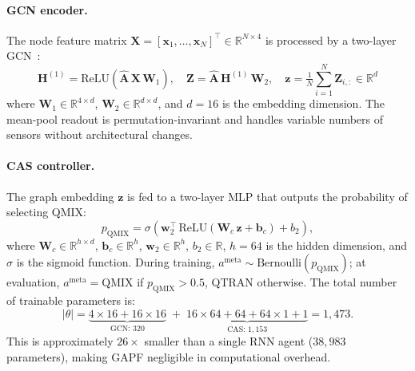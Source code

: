 \documentclass[12pt, onecolumn, journal]{IEEEtran}
\begin{document}
\paragraph{GCN encoder.}
The node feature matrix $\mathbf{X} = [\mathbf{x}_1, \dots, \mathbf{x}_N]^\top \in \mathbb{R}^{N \times 4}$ is processed by a two-layer GCN~\cite{kipf2017semi}:
\begin{equation}
    \mathbf{H}^{(1)} = \text{ReLU}(\hat{\mathbf{A}}\,\mathbf{X}\,\mathbf{W}_1), \quad
    \mathbf{Z} = \hat{\mathbf{A}}\,\mathbf{H}^{(1)}\,\mathbf{W}_2, \quad
    \mathbf{z} = \tfrac{1}{N}\textstyle\sum_{i=1}^{N} \mathbf{Z}_{i,:} \in \mathbb{R}^{d}
    \label{eq:gcn}
\end{equation}
where $\mathbf{W}_1 \in \mathbb{R}^{4 \times d}$, $\mathbf{W}_2 \in \mathbb{R}^{d \times d}$, and $d = 16$ is the embedding dimension. The mean-pool readout is permutation-invariant and handles variable numbers of sensors without architectural changes.

\paragraph{CAS controller.}
The graph embedding $\mathbf{z}$ is fed to a two-layer MLP that outputs the probability of selecting QMIX:
\begin{equation}
    p_{\text{QMIX}} = \sigma\!\left(\mathbf{w}_2^\top\,\text{ReLU}\!\left(\mathbf{W}_c\,\mathbf{z} + \mathbf{b}_c\right) + b_2\right),
    \label{eq:cas_controller}
\end{equation}
where $\mathbf{W}_c \in \mathbb{R}^{h \times d}$, $\mathbf{b}_c \in \mathbb{R}^h$, $\mathbf{w}_2 \in \mathbb{R}^h$, $b_2 \in \mathbb{R}$, $h = 64$ is the hidden dimension, and $\sigma$ is the sigmoid function. During training, $a^{\text{meta}} \sim \text{Bernoulli}(p_{\text{QMIX}})$; at evaluation, $a^{\text{meta}} = \text{QMIX}$ if $p_{\text{QMIX}} > 0.5$, QTRAN otherwise. The total number of trainable parameters is:
\begin{equation}
    |\theta| = \underbrace{4 \times 16 + 16 \times 16}_{\text{GCN: } 320} \;+\; \underbrace{16 \times 64 + 64 + 64 \times 1 + 1}_{\text{CAS: } 1{,}153} = 1{,}473.
    \label{eq:param_count}
\end{equation}
This is approximately $26\times$ smaller than a single RNN agent ($38{,}983$ parameters), making GAPF negligible in computational overhead.
\end{document}
